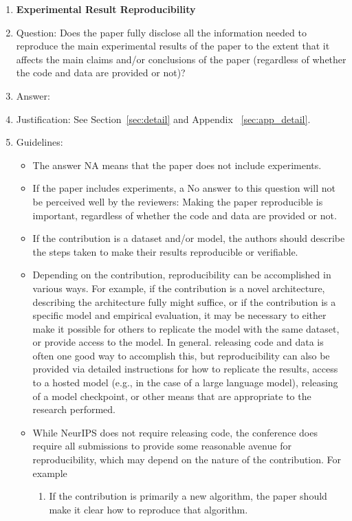 \documentclass{article}
\begin{document}
\begin{enumerate}
    \item {\bf Experimental Result Reproducibility}
    \item[] Question: Does the paper fully disclose all the information needed to reproduce the main experimental results of the paper to the extent that it affects the main claims and/or conclusions of the paper (regardless of whether the code and data are provided or not)?
    \item[] Answer: \answerYes{} %
    \item[] Justification: See Section~\ref{sec:detail} and Appendix ~\ref{sec:app_detail}.
    \item[] Guidelines:
    \begin{itemize}
        \item The answer NA means that the paper does not include experiments.
        \item If the paper includes experiments, a No answer to this question will not be perceived well by the reviewers: Making the paper reproducible is important, regardless of whether the code and data are provided or not.
        \item If the contribution is a dataset and/or model, the authors should describe the steps taken to make their results reproducible or verifiable. 
        \item Depending on the contribution, reproducibility can be accomplished in various ways. For example, if the contribution is a novel architecture, describing the architecture fully might suffice, or if the contribution is a specific model and empirical evaluation, it may be necessary to either make it possible for others to replicate the model with the same dataset, or provide access to the model. In general. releasing code and data is often one good way to accomplish this, but reproducibility can also be provided via detailed instructions for how to replicate the results, access to a hosted model (e.g., in the case of a large language model), releasing of a model checkpoint, or other means that are appropriate to the research performed.
        \item While NeurIPS does not require releasing code, the conference does require all submissions to provide some reasonable avenue for reproducibility, which may depend on the nature of the contribution. For example
        \begin{enumerate}
            \item If the contribution is primarily a new algorithm, the paper should make it clear how to reproduce that algorithm.

\end{enumerate}
\end{itemize}
\end{enumerate}
\end{document}
